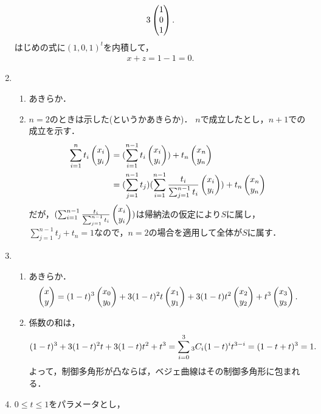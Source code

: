 \documentclass[9pt]{ltjsarticle}
\begin{document}
\begin{enumerate}[label=(問題\arabic*)]
\begin{align}
3 \left(\begin{matrix} 1 \\ 0 \\ 1 \end{matrix}\right).
\end{align}
はじめの式に$(1,0,1)^t$を内積して，
\begin{align}
 x+z = 1 - 1 = 0.
\end{align}
 \item
\begin{enumerate}[label=(\alph*)]
 \item あきらか．
 \item $n=2$のときは示した(というかあきらか)．
$n$で成立したとし，$n+1$での成立を示す．
\begin{align}
 \sum_{i=1}^n t_i \left(\begin{matrix} x_i \\ y_i \end{matrix}\right)
&=
(\sum_{i=1}^{n-1}t_i \left(\begin{matrix} x_i \\ y _i \end{matrix}\right)) + t_n \left(\begin{matrix} x_n \\ y_n \end{matrix}\right)\\
 &=
(\sum_{j=1}^{n-1}t_j)(\sum_{i=1}^{n-1}\frac{t_i}{\sum_{j=1}^{n-1}t_i} \left(\begin{matrix} x_i \\ y _i \end{matrix}\right)) + t_n \left(\begin{matrix} x_n \\ y_n \end{matrix}\right)\\
\end{align}
だが，$(\sum_{i=1}^{n-1}\frac{t_i}{\sum_{j=1}^{n-1}t_i} \left(\begin{matrix} x_i \\ y _i \end{matrix}\right))$は帰納法の仮定により$S$に属し，$\sum_{j=1}^{n-1}t_j + t_n = 1$なので，$n=2$の場合を適用して全体が$S$に属す．
\end{enumerate}
 \item
\begin{enumerate}[label=(\alph*)]
 \item あきらか．
\begin{align}
 \left(\begin{matrix} x \\ y \end{matrix}\right)=
(1-t)^3 \left(\begin{matrix} x_0 \\ y_0 \end{matrix}\right)
+
3(1-t)^2t \left(\begin{matrix} x_1 \\ y_1 \end{matrix}\right)
+
3(1-t) t^2 \left(\begin{matrix} x_2 \\ y_2 \end{matrix}\right)
+
t^3 \left(\begin{matrix} x_3 \\ y _3 \end{matrix}\right).
\end{align}
 \item 係数の和は，
\begin{align}
(1-t)^3 + 3(1-t)^2 t + 3(1-t)t^2 + t^3
=
\sum_{i=0}^3 {}_{3}C_{i} (1-t)^i t^{3-i}
=
(1-t + t)^3
=
1.
\end{align}
よって，制御多角形が凸ならば，ベジェ曲線はその制御多角形に包まれる．
\end{enumerate}
 \item $0\le t \le 1$をパラメータとし，

\end{enumerate}
\end{document}
